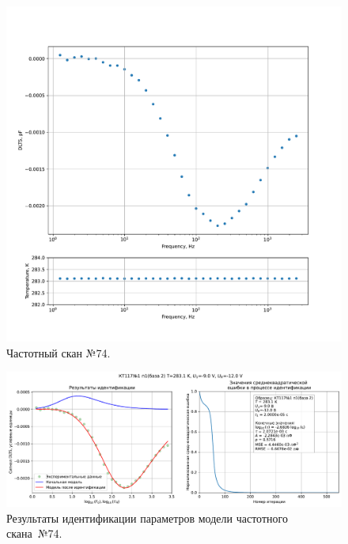 \begin{figure}[!ht]
    \centering
    \includegraphics[width=1\textwidth]{../plots/КТ117№1_п1(база 2)_2500Гц-1Гц_1пФ_+10С_-9В-12В_50мВ_20мкс_шаг_0,1.pdf}
    \caption{Частотный скан №74.}
    \label{pic:frequency_scan_74}
\end{figure}

\begin{figure}[!ht]
    \centering
    \includegraphics[width=1\textwidth]{../plots/КТ117№1_п1(база 2)_2500Гц-1Гц_1пФ_+10С_-9В-12В_50мВ_20мкс_шаг_0,1_model.pdf}
    \caption{Результаты идентификации параметров модели частотного скана~№74.}
    \label{pic:frequency_scan_model74}
\end{figure}

\pagebreak



